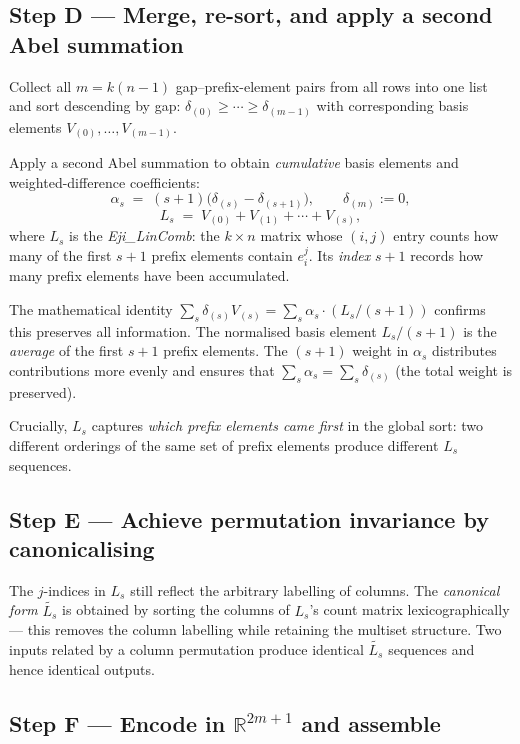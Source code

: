 \documentclass[11pt,a4paper]{article}
\newcommand{\eji}[2]{e^{#1}_{#2}}       %
\newcommand{\canon}[1]{\widetilde{#1}}  %
\newcommand{\R}{\mathbb{R}}
\begin{document}
\subsection*{Step D — Merge, re-sort, and apply a second Abel summation}

Collect all $m = k(n-1)$ gap--prefix-element pairs from all rows into one list
and sort descending by gap: $\delta_{(0)} \ge \cdots \ge \delta_{(m-1)}$ with
corresponding basis elements $V_{(0)},\ldots,V_{(m-1)}$.

Apply a second Abel summation to obtain \emph{cumulative} basis elements and
weighted-difference coefficients:
\[
  \alpha_s \;=\; (s+1)\bigl(\delta_{(s)} - \delta_{(s+1)}\bigr),
  \qquad \delta_{(m)} := 0,
\]
\[
  L_s \;=\; V_{(0)} + V_{(1)} + \cdots + V_{(s)},
\]
where $L_s$ is the \emph{Eji\_LinComb}: the $k\times n$ matrix whose $(i,j)$
entry counts how many of the first $s+1$ prefix elements contain $\eji{j}{i}$.
Its \emph{index} $s+1$ records how many prefix elements have been accumulated.

The mathematical identity $\sum_s \delta_{(s)} V_{(s)} = \sum_s \alpha_s
\cdot (L_s/(s+1))$ confirms this preserves all information.  The normalised
basis element $L_s/(s+1)$ is the \emph{average} of the first $s+1$ prefix
elements.  The $(s+1)$ weight in $\alpha_s$ distributes contributions more
evenly and ensures that $\sum_s \alpha_s = \sum_s \delta_{(s)}$ (the total
weight is preserved).

Crucially, $L_s$ captures \emph{which prefix elements came first} in the
global sort: two different orderings of the same set of prefix elements produce
different $L_s$ sequences.

\subsection*{Step E — Achieve permutation invariance by canonicalising}

The $j$-indices in $L_s$ still reflect the arbitrary labelling of columns.
The \emph{canonical form} $\canon{L_s}$ is obtained by sorting the columns of
$L_s$'s count matrix lexicographically — this removes the column labelling
while retaining the multiset structure.  Two inputs related by a column
permutation produce identical $\canon{L_s}$ sequences and hence identical
outputs.

\subsection*{Step F — Encode in $\R^{2m+1}$ and assemble}
\end{document}
